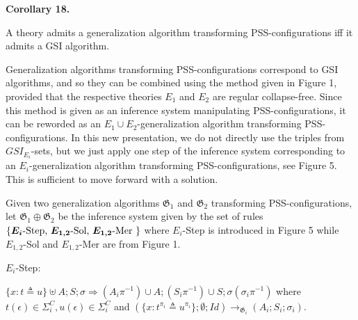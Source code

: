 \documentclass[10pt,a4paper]{amsart}
\begin{document}
\par\medskip\noindent\textbf{Corollary 18.}\par
 
 
A theory admits a generalization algorithm transforming PSS-configurations iff it admits a GSI algorithm.\par
 
 
 
 
Generalization algorithms transforming PSS-configurations correspond to GSI algorithms, and so they can be combined using the method given in Figure 1, provided that the respective theories $E_{1}$ and $E_{2}$ are regular collapse-free. Since this method is given as an inference system manipulating PSS-configurations, it can be reworded as an $E_{1}\cup E_{2}$-generalization algorithm transforming PSS-configurations. In this new presentation, we do not directly use the triples from $GSI_{E_{i}}$-sets, but we just apply one step of the inference system corresponding to an $E_{i}$-generalization algorithm transforming PSS-configurations, see Figure 5. This is sufficient to move forward with a solution.\par
 
 
 
Given two generalization algorithms $\mathfrak{G}_{1}$ and $\mathfrak{G}_{2}$ transforming PSS-configurations, let $\mathfrak{G}_{1}\oplus\mathfrak{G}_{2}$ be the inference system given by the set of rules $\{\text{{\boldmath$E_{i}$-Step}, {\boldmath$E_{1,2}$-Sol}, {\boldmath$E_{1,2}$-Mer}
}\}$ where $E_{i}$-Step is introduced in Figure 5 while $E_{1,2}$-Sol and $E_{1,2}$-Mer are from Figure 1.\par
 
 
  
\par
 
$E_{i}$-Step:\par
 
\par
 
$\{x:t\triangleq u\}\uplus A;S;\sigma\Longrightarrow(A_{i}\pi^{-1})\cup A;(S_{i}\pi^{-1})\cup S;\sigma(\sigma_{i}\pi^{-1})$ where $t(\epsilon)\in{\Sigma}^{C}_{i},u(\epsilon)\in{\Sigma}^{C}_{i}$ and $(\{x:t^{\pi_{i}}\triangleq u^{\pi_{i}}\};\emptyset;\mathit{Id})\longrightarrow_{\mathfrak{G}_{i}}(A_{i};S_{i};\sigma_{i})$.\par
  
\end{document}
